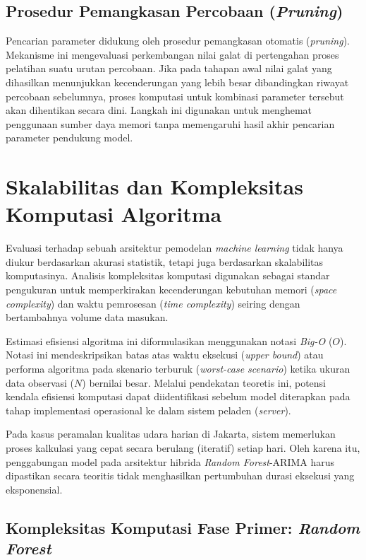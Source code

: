 \subsection{Prosedur Pemangkasan Percobaan (\textit{Pruning})}

Pencarian parameter didukung oleh prosedur pemangkasan otomatis (\textit{pruning}). Mekanisme ini mengevaluasi perkembangan nilai galat di pertengahan proses pelatihan suatu urutan percobaan. Jika pada tahapan awal nilai galat yang dihasilkan menunjukkan kecenderungan yang lebih besar dibandingkan riwayat percobaan sebelumnya, proses komputasi untuk kombinasi parameter tersebut akan dihentikan secara dini. Langkah ini digunakan untuk menghemat penggunaan sumber daya memori tanpa memengaruhi hasil akhir pencarian parameter pendukung model.

\section{Skalabilitas dan Kompleksitas Komputasi Algoritma}

Evaluasi terhadap sebuah arsitektur pemodelan \textit{machine learning} tidak hanya diukur berdasarkan akurasi statistik, tetapi juga berdasarkan skalabilitas komputasinya. Analisis kompleksitas komputasi digunakan sebagai standar pengukuran untuk memperkirakan kecenderungan kebutuhan memori (\textit{space complexity}) dan waktu pemrosesan (\textit{time complexity}) seiring dengan bertambahnya volume data masukan.

Estimasi efisiensi algoritma ini diformulasikan menggunakan notasi \textit{Big-O} ($O$). Notasi ini mendeskripsikan batas atas waktu eksekusi (\textit{upper bound}) atau performa algoritma pada skenario terburuk (\textit{worst-case scenario}) ketika ukuran data observasi ($N$) bernilai besar. Melalui pendekatan teoretis ini, potensi kendala efisiensi komputasi dapat diidentifikasi sebelum model diterapkan pada tahap implementasi operasional ke dalam sistem peladen (\textit{server}).

Pada kasus peramalan kualitas udara harian di Jakarta, sistem memerlukan proses kalkulasi yang cepat secara berulang (iteratif) setiap hari. Oleh karena itu, penggabungan model pada arsitektur hibrida \textit{Random Forest}-ARIMA harus dipastikan secara teoritis tidak menghasilkan pertumbuhan durasi eksekusi yang eksponensial.

\newpage

\subsection{Kompleksitas Komputasi Fase Primer: \textit{Random Forest}}

